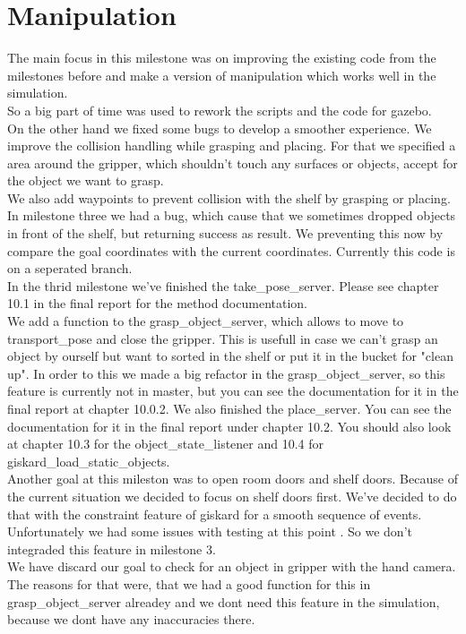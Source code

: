 \documentclass[main.tex]{subfiles}
\begin{document}
	
	\chapter{Manipulation}
	
	The main focus in this milestone was on improving the existing code from the milestones before and make a version of manipulation which works well in the simulation.\\
	So a big part of time was used to rework the scripts and the code for gazebo.\\
	On the other hand we fixed some bugs to develop a smoother experience. We improve the collision handling while grasping and placing. For that we specified a area around the gripper, which shouldn't touch any surfaces or objects, accept for the object we want to grasp.\\
	We also add waypoints to prevent collision with the shelf by grasping or placing.\\
	In milestone three we had a bug, which cause that we sometimes dropped objects in front of the shelf, but returning success as result. We preventing this now by compare the goal coordinates with the current coordinates. Currently this code is on a seperated branch.\\
	In the thrid milestone we've finished the take\_pose\_server. Please see chapter 10.1 in the final report for the method documentation.\\
	We add a function to the grasp\_object\_server, which allows to move to transport\_pose and close the gripper. This is usefull in case we can't grasp an object by ourself but want to sorted in the shelf or put it in the bucket for "clean up". In order to this we made a big refactor in the grasp\_object\_server, so this feature is currently not in master, but you can see the documentation for it in the final report at chapter 10.0.2.
	We also finished the place\_server. You can see the documentation for it in the final report under chapter 10.2. You should also look at chapter 10.3 for the object\_state\_listener and 10.4 for giskard\_load\_static\_objects.\\
	Another goal at this mileston was to open room doors and shelf doors. Because of the current situation we decided to focus on shelf doors first. We've decided to do that with the constraint feature of giskard for a smooth sequence of events. Unfortunately we had some issues with testing at this point . So we don't integraded this feature in milestone 3.\\
	We have discard our goal to check for an object in gripper with the hand camera. The reasons for that were, that we had a good function for this in grasp\_object\_server alreadey and we dont need this feature in the simulation, because we dont have any inaccuracies there.
	
	
	
	


	
\end{document}
